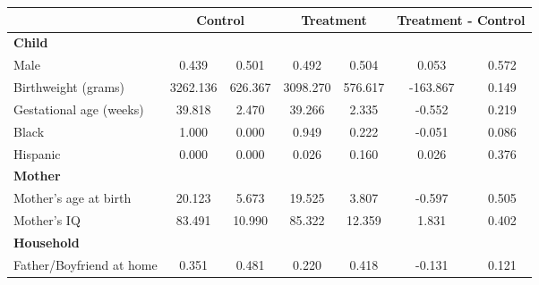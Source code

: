 \begin{tabular}{lcccccc}
\toprule
& \multicolumn{2}{c}{Control} & \multicolumn{2}{c}{Treatment} & \multicolumn{2}{c}{Treatment - Control} \\
\midrule
\textbf{Child} & & & & & & \\
\quad\quad Male & 0.439 & 0.501 & 0.492 & 0.504 & 0.053 & 0.572 \\
\quad\quad Birthweight (grams) & 3262.136 & 626.367 & 3098.270 & 576.617 & -163.867 & 0.149 \\
\quad\quad Gestational age (weeks) & 39.818 & 2.470 & 39.266 & 2.335 & -0.552 & 0.219 \\
\quad\quad Black & 1.000 & 0.000 & 0.949 & 0.222 & -0.051 & 0.086 \\
\quad\quad Hispanic & 0.000 & 0.000 & 0.026 & 0.160 & 0.026 & 0.376 \\
\textbf{Mother} & & & & & & \\
\quad\quad Mother's age at birth & 20.123 & 5.673 & 19.525 & 3.807 & -0.597 & 0.505 \\
\quad\quad Mother's IQ & 83.491 & 10.990 & 85.322 & 12.359 & 1.831 & 0.402 \\
\textbf{Household} & & & & & & \\
\quad\quad Father/Boyfriend at home & 0.351 & 0.481 & 0.220 & 0.418 & -0.131 & 0.121 \\
\bottomrule
\end{tabular}
